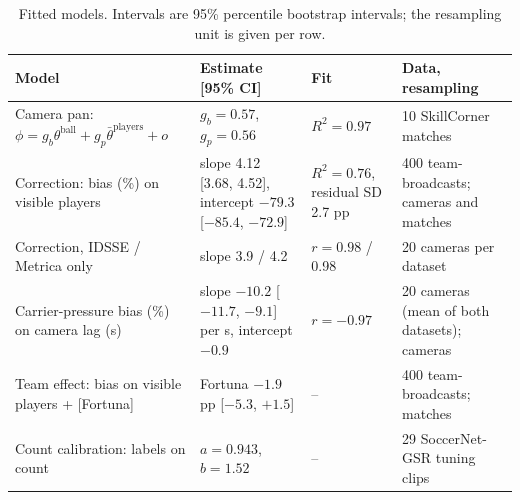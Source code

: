 \documentclass[]{interact}
\begin{document}
\begin{table}[ht]
\centering
\caption{Fitted models. Intervals are 95\% percentile bootstrap intervals; the resampling unit is given per row.}
\label{tab:models}
\small
\begin{tabular}{p{3.4cm}p{3.9cm}p{1.9cm}p{2.6cm}}
\toprule
Model & Estimate [95\% CI] & Fit & Data, resampling \\
\midrule
Camera pan: $\phi = g_b\theta^{\text{ball}} + g_p\bar\theta^{\text{players}} + o$ & $g_b = 0.57$, $g_p = 0.56$ &
$R^2 = 0.97$ & 10 SkillCorner matches \\
Correction: bias (\%) on visible players & slope 4.12 [3.68, 4.52], intercept $-79.3$ [$-85.4$, $-72.9$] &
$R^2 = 0.76$, residual SD 2.7 pp & 400 team-broadcasts; cameras and matches \\
Correction, IDSSE / Metrica only & slope 3.9 / 4.2 & $r = 0.98$ / 0.98 & 20 cameras per dataset \\
Carrier-pressure bias (\%) on camera lag (s) & slope $-10.2$ [$-11.7$, $-9.1$] per s, intercept $-0.9$ & $r = -0.97$
& 20 cameras (mean of both datasets); cameras \\
Team effect: bias on visible players + [Fortuna] & Fortuna $-1.9$ pp [$-5.3$, $+1.5$] & -- & 400 team-broadcasts;
matches \\
Count calibration: labels on count & $a = 0.943$, $b = 1.52$ & -- & 29 SoccerNet-GSR tuning clips \\
\bottomrule
\end{tabular}
\end{table}
\end{document}
